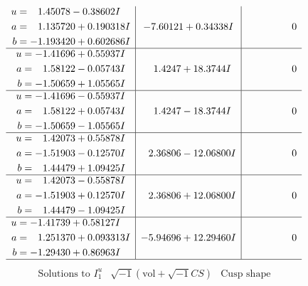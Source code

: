 \documentclass[1p]{elsarticle_modified}
\theoremstyle{definition}
\newcommand{\I}{\sqrt{-1}}
\begin{document}
$$\begin{array}{c|c|c}
\begin{aligned}
u &= \phantom{-}1.45078 - 0.38602 I \\
a &= \phantom{-}1.135720 + 0.190318 I \\
b &= -1.193420 + 0.602686 I\end{aligned}
 & -7.60121 + 0.34338 I & \phantom{-0.000000 } 0 \\ \hline\begin{aligned}
u &= -1.41696 + 0.55937 I \\
a &= \phantom{-}1.58122 - 0.05743 I \\
b &= -1.50659 + 1.05565 I\end{aligned}
 & \phantom{-}1.4247 + 18.3744 I & \phantom{-0.000000 } 0 \\ \hline\begin{aligned}
u &= -1.41696 - 0.55937 I \\
a &= \phantom{-}1.58122 + 0.05743 I \\
b &= -1.50659 - 1.05565 I\end{aligned}
 & \phantom{-}1.4247 - 18.3744 I & \phantom{-0.000000 } 0 \\ \hline\begin{aligned}
u &= \phantom{-}1.42073 + 0.55878 I \\
a &= -1.51903 - 0.12570 I \\
b &= \phantom{-}1.44479 + 1.09425 I\end{aligned}
 & \phantom{-}2.36806 - 12.06800 I & \phantom{-0.000000 } 0 \\ \hline\begin{aligned}
u &= \phantom{-}1.42073 - 0.55878 I \\
a &= -1.51903 + 0.12570 I \\
b &= \phantom{-}1.44479 - 1.09425 I\end{aligned}
 & \phantom{-}2.36806 + 12.06800 I & \phantom{-0.000000 } 0 \\ \hline\begin{aligned}
u &= -1.41739 + 0.58127 I \\
a &= \phantom{-}1.251370 + 0.093313 I \\
b &= -1.29430 + 0.86963 I\end{aligned}
 & -5.94696 + 12.29460 I & \phantom{-0.000000 } 0\\
 \hline 
 \end{array}$$\newpage$$\begin{array}{c|c|c}  
\text{Solutions to }I^u_{1}& \I (\text{vol} + \sqrt{-1}CS) & \text{Cusp shape}\\
 \hline 
\begin{aligned}

\end{aligned}
\end{array}$$
\end{document}
